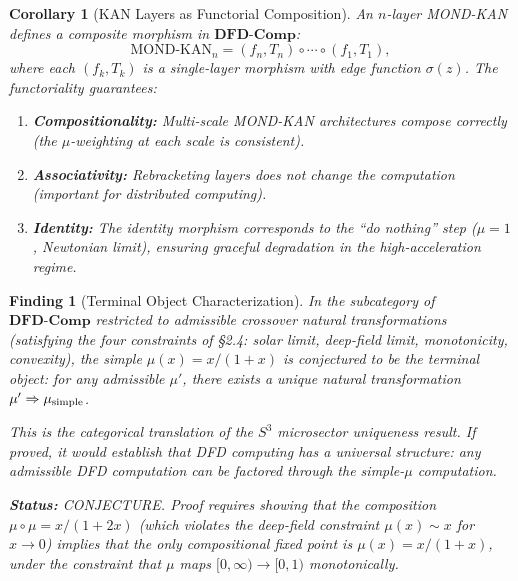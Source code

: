 \documentclass[11pt]{article}
\newtheorem{corollary}[theorem]{Corollary}
\newtheorem{finding}[theorem]{Finding}
\theoremstyle{definition}
\theoremstyle{remark}
\begin{document}
\begin{corollary}[KAN Layers as Functorial Composition]
\label{cor:kan-functorial}
An $n$-layer MOND-KAN defines a composite morphism in $\mathbf{DFD\text{-}Comp}$:
\begin{equation}
  \text{MOND-KAN}_n = (f_n, T_n) \circ \cdots \circ (f_1, T_1),
  \label{eq:kan-composite}
\end{equation}
where each $(f_k, T_k)$ is a single-layer morphism with edge function
$\sigma(z)$. The functoriality guarantees:
\begin{enumerate}
\item \textbf{Compositionality:} Multi-scale MOND-KAN architectures compose
  correctly (the $\mu$-weighting at each scale is consistent).
\item \textbf{Associativity:} Rebracketing layers does not change the
  computation (important for distributed computing).
\item \textbf{Identity:} The identity morphism corresponds to the
  ``do nothing'' step ($\mu = 1$, Newtonian limit), ensuring graceful
  degradation in the high-acceleration regime.
\end{enumerate}
\end{corollary}

\begin{finding}[Terminal Object Characterization]
\label{find:terminal-object}
In the subcategory of $\mathbf{DFD\text{-}Comp}$ restricted to admissible
crossover natural transformations (satisfying the four constraints of
\S2.4: solar limit, deep-field limit, monotonicity, convexity), the
simple $\mu(x) = x/(1+x)$ is conjectured to be the \emph{terminal object}:
for any admissible $\mu'$, there exists a unique natural transformation
$\mu' \Rightarrow \mu_{\rm simple}$.

This is the categorical translation of the $S^3$ microsector uniqueness
result. If proved, it would establish that DFD computing has a
\emph{universal} structure: any admissible DFD computation can be factored
through the simple-$\mu$ computation.

\textbf{Status:} CONJECTURE. Proof requires showing that the composition
$\mu \circ \mu = x/(1 + 2x)$ (which violates the deep-field constraint
$\mu(x) \sim x$ for $x \to 0$) implies that the only compositional
fixed point is $\mu(x) = x/(1+x)$, under the constraint that $\mu$
maps $[0,\infty) \to [0,1)$ monotonically.
\end{finding}

\end{document}
